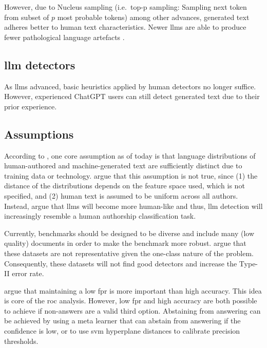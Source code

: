 However, due to Nucleus sampling (i.e.\ top-p sampling: Sampling next token from subset of $p$ most probable tokens) 
among other advances, generated text adheres better to human text characteristics.
Newer \acp{llm} are able to produce fewer pathological language artefacts \citep{llm_detection_av_2025}.

\subsection{\ac{llm} detectors}

As \acp{llm} advanced, basic heuristics applied by human detectors no longer suffice.
However, experienced ChatGPT users can still detect generated text due to their prior experience.

\subsection{Assumptions}

According to \citet{llm_detection_av_2025}, one core assumption as of today is that 
language distributions of human-authored and machine-generated text are sufficiently distinct due to training data or technology.
\citet{llm_detection_av_2025} argue that this assumption is not true, since 
(1) the distance of the distributions depends on the feature space used, which is not specified, and
(2) human text is assumed to be uniform across all authors.
Instead, \citet{llm_detection_av_2025} argue that \acp{llm} will become more human-like and thus, 
\ac{llm} detection will increasingly resemble a human authorship classification task.

Currently, benchmarks should be designed to be diverse and include many (low quality) documents in order to make the benchmark more robust.
\citet{llm_detection_av_2025} argue that these datasets are not representative given the one-class nature of the problem.
Consequently, these datasets will not find good detectors and increase the Type-II error rate.

\citet{llm_detection_av_2025} argue that maintaining a low \ac{fpr} is more important than high accuracy.
This idea is core of the \ac{roc} analysis.
However, low \ac{fpr} and high accuracy are both possible to achieve if non-answers are a valid third option.
Abstaining from answering can be achieved by using a meta learner that can abstain from answering if the confidence is low, 
or to use \ac{svm} hyperplane distances to calibrate precision thresholds.

